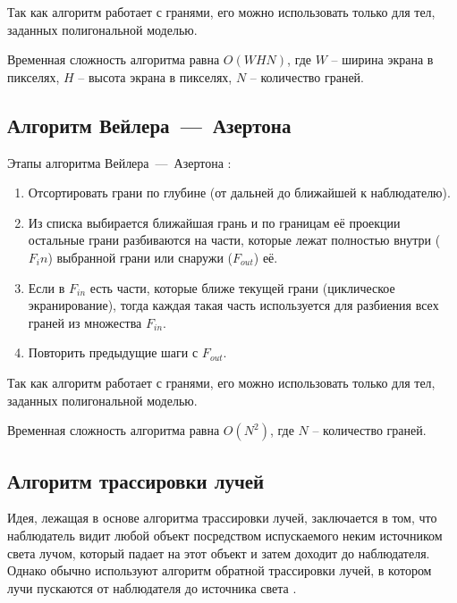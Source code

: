 Так как алгоритм работает с гранями, его можно использовать только для тел, заданных полигональной моделью.

Временная сложность алгоритма равна $O(WHN)$, где $W$ -- ширина экрана в пикселях, $H$ -- высота экрана в пикселях, $N$ -- количество граней.



\subsection{Алгоритм Вейлера~---~Азертона}

Этапы алгоритма Вейлера~---~Азертона \cite{tomsk_2011}:

\begin{enumerate}[label=\arabic*)]
    \item Отсортировать грани по глубине (от дальней до ближайшей к наблюдателю). 
    \item Из списка выбирается ближайшая грань и по границам её проекции остальные грани разбиваются на части, которые лежат полностью внутри ($F_in$) выбранной грани или снаружи ($F_{out}$) её.
    \item Если в $F_{in}$ есть части, которые ближе текущей грани (циклическое экранирование), тогда каждая такая часть используется для разбиения всех граней из множества $F_{in}$.
    \item Повторить предыдущие шаги с $F_{out}$.
\end{enumerate}

Так как алгоритм работает с гранями, его можно использовать только для тел, заданных полигональной моделью.

Временная сложность алгоритма равна $O(N^2)$, где $N$ -- количество граней.



\subsection{Алгоритм трассировки лучей}

Идея, лежащая в основе алгоритма трассировки лучей, заключается в том, что наблюдатель видит любой объект посредством испускаемого неким источником света лучом, который падает на этот объект и затем доходит до наблюдателя. Однако обычно используют алгоритм обратной трассировки лучей, в котором лучи пускаются от наблюдателя до источника света \cite{tomsk_2011}.

